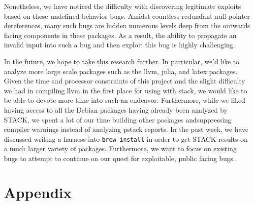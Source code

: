 \documentclass[9pt,twocolumn]{article}
\begin{document}
Nonetheless, we have noticed the difficulty with discovering legitimate
exploits based on these undefined behavior bugs. Amidst countless redundant
null pointer dereferences, many such bugs are hidden numerous levels deep from
the outwards facing components in these packages. As a result, the ability to
propagate an invalid input into such a bug and then exploit this bug is highly
challenging.

In the future, we hope to take this research further. In particular, we'd like
to analyze more large scale packages such as the llvm, julia, and latex
packages. Given the time and processor constraints of this project and the
slight difficulty we had in compiling llvm in the first place for using with
stack, we would like to be able to devote more time into such an endeavor.
Furthermore, while we liked having access to all the Debian packages having
already been analyzed by STACK, we spent a lot of our time building other
packages andsuppressing compiler warnings instead of analyzing pstack reports.
In the past week, we have discussed writing a harness into \texttt{brew
install} in order to get STACK results on a much larger variety of packages.
Furthermore, we want to focus on existing bugs to attempt to continue on our
quest for exploitable, public facing bugs..



\section{Appendix}
\label{sec:appendix}
\end{document}

